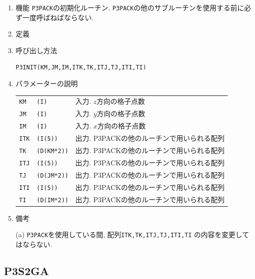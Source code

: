 \documentclass[a4j,fleqn]{jarticle}
\begin{document}
\begin{enumerate}

\item 機能 
{\tt P3PACK}の初期化ルーチン. 
{\tt P3PACK}の他のサブルーチンを使用する前に必ず一度呼ばねばならない.

\item 定義

\item 呼び出し方法 
    
{\tt P3INIT(KM,JM,IM,ITK,TK,ITJ,TJ,ITI,TI)}
  
\item パラメーターの説明 
    
\begin{tabular}{lll}
{\tt KM} & {\tt (I)} & 入力. $z$方向の格子点数\\
{\tt JM} & {\tt (I)} & 入力. $y$方向の格子点数\\
{\tt IM} & {\tt (I)} & 入力. $x$方向の格子点数\\
{\tt ITK}  & {\tt (I(5))}    & 出力. P3PACKの他のルーチンで用いられる配列\\
{\tt TK}   & {\tt (D(KM*2))} & 出力. P3PACKの他のルーチンで用いられる配列\\
{\tt ITJ}  & {\tt (I(5))}    & 出力. P3PACKの他のルーチンで用いられる配列\\
{\tt TJ}   & {\tt (D(JM*2))} & 出力. P3PACKの他のルーチンで用いられる配列\\
{\tt ITI}  & {\tt (I(5))}    & 出力. P3PACKの他のルーチンで用いられる配列\\
{\tt TI}   & {\tt (D(IM*2))} & 出力. P3PACKの他のルーチンで用いられる配列
\end{tabular}

\item 備考

(a) {\tt P3PACK}を使用している間, 配列{\tt ITK,TK,ITJ,TJ,ITI,TI}
の内容を変更してはならない.

\end{enumerate}


\subsection{P3S2GA}
\end{document}
